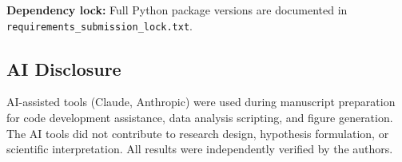 \documentclass[12pt]{article}
\begin{document}
\textbf{Dependency lock:} Full Python package versions are documented in \texttt{requirements\_submission\_lock.txt}.

\subsection*{AI Disclosure}

AI-assisted tools (Claude, Anthropic) were used during manuscript preparation for code development assistance, data analysis scripting, and figure generation. The AI tools did not contribute to research design, hypothesis formulation, or scientific interpretation. All results were independently verified by the authors.


\end{document}
